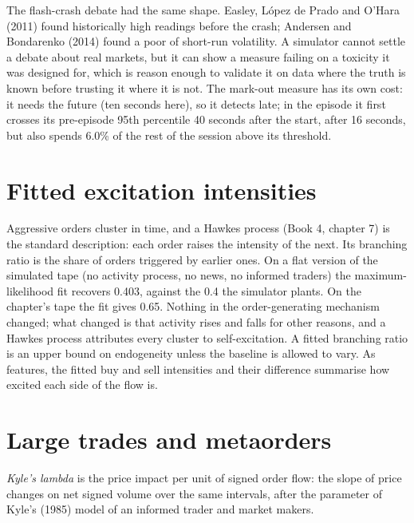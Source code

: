 The flash-crash debate had the same shape. Easley, López de Prado and O'Hara (2011) found historically high  readings before the
crash; Andersen and Bondarenko (2014) found  a poor  of short-run volatility. A simulator cannot settle a debate about real
markets, but it can show a measure failing on a toxicity it was designed for, which is reason enough to validate it on data where the
truth is known before trusting it where it is not. The mark-out measure has its own cost: it needs the future (ten seconds here), so it
detects late; in the episode it first crosses its pre-episode 95th percentile 40 seconds after the start,  after 16 seconds, but 
also spends 6.0\% of the rest of the session above its threshold.

\section{Fitted excitation intensities}

Aggressive orders cluster in time, and a Hawkes process (Book 4, chapter 7) is the standard description: each order raises the intensity
of the next. Its branching ratio is the share of orders triggered by earlier ones. On a flat version of the simulated tape (no activity
process, no news, no informed traders) the maximum-likelihood fit recovers 0.403, against the 0.4 the simulator plants. On the chapter's
tape the fit gives 0.65. Nothing in the order-generating mechanism changed; what changed is that activity rises and falls for other
reasons, and a Hawkes process attributes every cluster to self-excitation. A fitted branching ratio is an upper bound on endogeneity
unless the baseline is allowed to vary. As features, the fitted buy and sell intensities and their difference summarise how excited each
side of the flow is.

\section{Large trades and metaorders}

\begin{definition}\label{def:rs:trade-flow-features:lambda}
\emph{Kyle's lambda} is the price impact per unit of signed order flow: the slope of price changes on net signed
volume over the same intervals, after the parameter of Kyle's (1985) model of an informed trader and market makers.
\end{definition}

